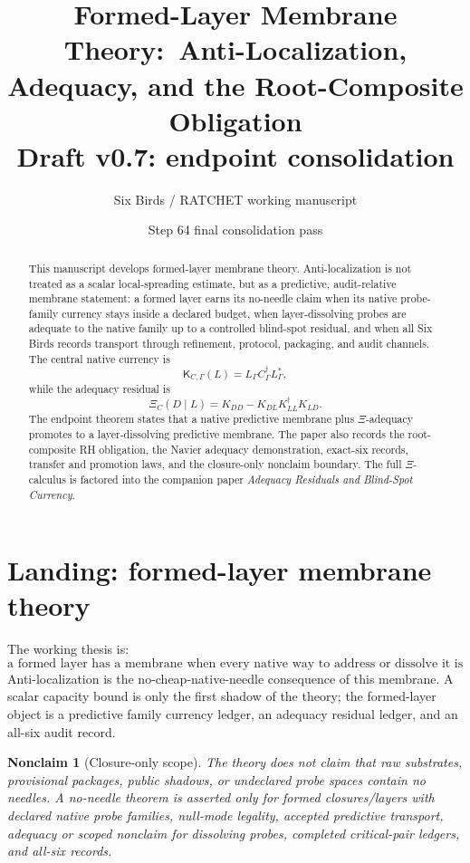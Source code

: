 \documentclass[11pt]{article}
\title{Formed-Layer Membrane Theory:\ Anti-Localization, Adequacy, and the Root-Composite Obligation\\\large Draft v0.7: endpoint consolidation}
\author{Six Birds / RATCHET working manuscript}
\date{Step 64 final consolidation pass}
\newtheorem{nonclaim}[theorem]{Nonclaim}
\newcommand{\K}{\mathsf K}
\newcommand{\XiRes}{\Xi}
\begin{document}
\maketitle

\begin{abstract}
This manuscript develops formed-layer membrane theory.  Anti-localization is not treated as a scalar local-spreading estimate, but as a predictive, audit-relative membrane statement: a formed layer earns its no-needle claim when its native probe-family currency stays inside a declared budget, when layer-dissolving probes are adequate to the native family up to a controlled blind-spot residual, and when all Six Birds records transport through refinement, protocol, packaging, and audit channels.  The central native currency is
\[
  \K_{C,\Gamma}(L)=L_\Gamma C_\Gamma^\dagger L_\Gamma^*,
\]
while the adequacy residual is
\[
  \XiRes_C(D\mid L)=K_{DD}-K_{DL}K_{LL}^\dagger K_{LD}.
\]
The endpoint theorem states that a native predictive membrane plus \(\Xi\)-adequacy promotes to a layer-dissolving predictive membrane.  The paper also records the root-composite RH obligation, the Navier adequacy demonstration, exact-six records, transfer and promotion laws, and the closure-only nonclaim boundary.  The full \(\Xi\)-calculus is factored into the companion paper \emph{Adequacy Residuals and Blind-Spot Currency}.
\end{abstract}

\tableofcontents

\section{Landing: formed-layer membrane theory}
The working thesis is:
\[
\boxed{\text{a formed layer has a membrane when every native way to address or dissolve it is priced.}}
\]
Anti-localization is the no-cheap-native-needle consequence of this membrane.  A scalar capacity bound is only the first shadow of the theory; the formed-layer object is a predictive family currency ledger, an adequacy residual ledger, and an all-six audit record.

\begin{nonclaim}[Closure-only scope]
The theory does not claim that raw substrates, provisional packages, public shadows, or undeclared probe spaces contain no needles.  A no-needle theorem is asserted only for formed closures/layers with declared native probe families, null-mode legality, accepted predictive transport, adequacy or scoped nonclaim for dissolving probes, completed critical-pair ledgers, and all-six records.
\end{nonclaim}
\end{document}
